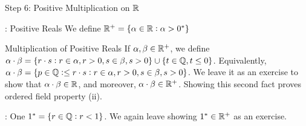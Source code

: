 \begin{nblank}{Step 6: Positive Multiplication on $\mathbb{R}$}
    \begin{ndef}{: Positive Reals}
        We define $\mathbb{R}^+ = \set{\alpha \in \mathbb{R}: \alpha > 0^*}$
    \end{ndef}
    \begin{ndef}{Multiplication of Positive Reals}
        If $\alpha, \beta \in \mathbb{R}^+$, we define $\alpha \cdot \beta = \set{r \cdot s: r \in \alpha, r> 0, s \in \beta, s > 0} \cup \set{t \in \mathbb{Q}, t \leq 0}$. Equivalently, $\alpha \cdot \beta = \set{p \in \mathbb{Q}:  \leq r \cdot s: r \in \alpha, r > 0, s \in \beta, s > 0}$. We leave it as an exercise to show that $\alpha \cdot \beta \in \mathbb{R}$, and moreover, $\alpha \cdot \beta \in \mathbb{R}^+$. Showing this second fact proves ordered field property (ii).
    \end{ndef}
    \begin{ndef}{: One}
        $1^* = \set{r \in \mathbb{Q}: r < 1}$. We again leave showing $1^* \in \mathbb{R}^+$ as an exercise. 
    \end{ndef}
\end{nblank}


